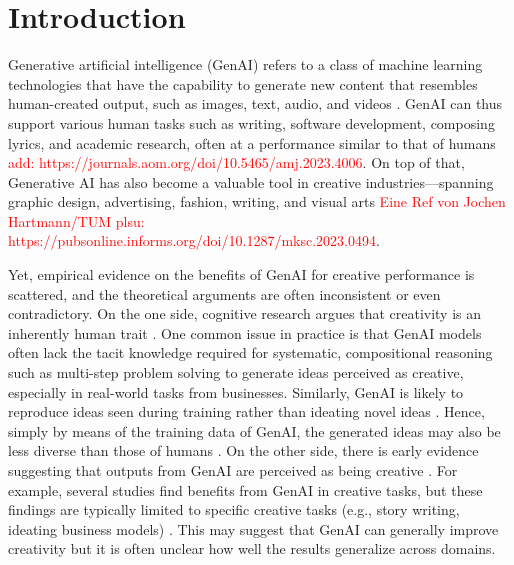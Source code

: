 \documentclass[manuscript, screen, review, acmsmall, anonymous]{acmart}
\newcommand{\TODO}[1]{\textcolor{red}{#1}}
\begin{document}
\section{Introduction}
\label{sec:Introduction}


Generative artificial intelligence (GenAI) refers to a class of machine learning technologies that have the capability to generate new content that resembles human-created output, such as images, text, audio, and videos  \cite{FeuerriegelBISE2024}. GenAI can thus support various human tasks such as writing, software development, composing lyrics, and academic research, often at a performance similar to that of humans \TODO{add: https://journals.aom.org/doi/10.5465/amj.2023.4006}\cite{Herbold2023, Cui2025, 10.1093/pnasnexus/pgae052, Ruksakulpiwat2024, brynjolfsson2024generativeaiwork}. On top of that, Generative AI has also become a valuable tool in creative industries---spanning graphic design, advertising, fashion, writing, and visual arts  \TODO{Eine Ref von Jochen Hartmann/TUM
plsu: https://pubsonline.informs.org/doi/10.1287/mksc.2023.0494}\cite{Sun_2024}. 

Yet, empirical evidence on the benefits of GenAI for creative performance is scattered, and the theoretical arguments are often inconsistent or even contradictory. On the one side, cognitive research argues that creativity is an inherently human trait \cite{aru2024artificialintelligenceinternalprocesses,sæbø2024stochasticshumanartificialcreativity}. One common issue in practice is that GenAI models often lack the tacit knowledge required for systematic, compositional reasoning such as multi-step problem solving to generate ideas perceived as creative, especially in real-world tasks from businesses. Similarly, GenAI is likely to reproduce ideas seen during training rather than ideating novel ideas \cite{ismayilzada2024creativityaiprogresseschallenges}. Hence, simply by means of the training data of GenAI, the generated ideas may also be less diverse than those of humans \cite{doi:10.1126/sciadv.adn5290}. On the other side, there is early evidence suggesting that outputs from GenAI are perceived as being creative \cite{wang2024aicreativehumans}. For example, several studies find benefits from GenAI in creative tasks, but these findings are typically limited to specific creative tasks (e.g., story writing, ideating business models) \cite{doi:10.1126/sciadv.adn5290, Lee2024, Zhou2024, Wadinambiarachchi_2024}. This may suggest that GenAI can generally improve creativity but it is often unclear how well the results generalize across domains.  
\end{document}
